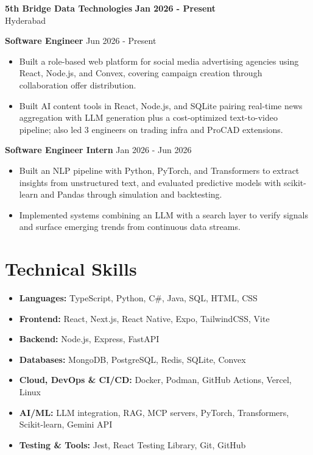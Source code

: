 \documentclass[a4paper,11pt]{article}
\newcommand{\resumeItem}[1]{\item \small{#1}}
\newcommand{\resumeSubheading}[4]{%
  \textbf{#1} \hfill \textbf{#2} \\
{#3} \hfill {#4}
}
\newcommand{\resumeSubHeadingListStart}{\begin{itemize}}
\newcommand{\resumeSubHeadingListEnd}{\end{itemize}}
\begin{document}
\resumeSubheading
{5th Bridge Data Technologies}{Jan 2026 - Present}
{Hyderabad}{}

\textbf{Software Engineer} \hfill {Jun 2026 - Present}
\resumeSubHeadingListStart
\resumeItem{Built a role-based web platform for social media advertising agencies using React, Node.js, and Convex, covering campaign creation through collaboration offer distribution.}
\resumeItem{Built AI content tools in React, Node.js, and SQLite pairing real-time news aggregation with LLM generation plus a cost-optimized text-to-video pipeline; also led 3 engineers on trading infra and ProCAD extensions.}
\resumeSubHeadingListEnd

\textbf{Software Engineer Intern} \hfill {Jan 2026 - Jun 2026}
\resumeSubHeadingListStart
\resumeItem{Built an NLP pipeline with Python, PyTorch, and Transformers to extract insights from unstructured text, and evaluated predictive models with scikit-learn and Pandas through simulation and backtesting.}
\resumeItem{Implemented systems combining an LLM with a search layer to verify signals and surface emerging trends from continuous data streams.}
\resumeSubHeadingListEnd


\section*{Technical Skills}
\begin{itemize}
\item \textbf{Languages:} TypeScript, Python, C\#, Java, SQL, HTML, CSS
\item \textbf{Frontend:} React, Next.js, React Native, Expo, TailwindCSS, Vite
\item \textbf{Backend:} Node.js, Express, FastAPI
\item \textbf{Databases:} MongoDB, PostgreSQL, Redis, SQLite, Convex
\item \textbf{Cloud, DevOps \& CI/CD:} Docker, Podman, GitHub Actions, Vercel, Linux
\item \textbf{AI/ML:} LLM integration, RAG, MCP servers, PyTorch, Transformers, Scikit-learn, Gemini API
\item \textbf{Testing \& Tools:} Jest, React Testing Library, Git, GitHub
\end{itemize}


\end{document}
